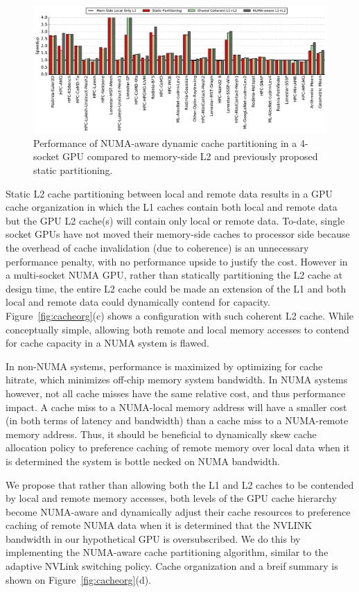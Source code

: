 \begin{figure}[t]
    \centering
    \includegraphics[width=1.0\textwidth]{figures/plot_merged_cache_WB.pdf}
    \caption{Performance of NUMA-aware dynamic cache partitioning in a 4-socket GPU compared to memory-side L2 and previously proposed static partitioning.}
    \label{fig:dynamiccaching}
\end{figure}

Static L2 cache partitioning between local and remote data results in a GPU cache
organization in which the L1 caches contain both local and remote data but the GPU
L2 cache(s) will contain only local or remote data.  To-date, single socket GPUs
have not moved their memory-side caches to processor side because the overhead of
cache invalidation (due to coherence) is an unnecessary performance penalty, with
no performance upside to justify the cost.  However in a multi-socket NUMA GPU,
rather than statically partitioning the L2 cache at design time, the entire L2 cache
could be made an extension of the L1 and both local and remote data could dynamically
contend for capacity. Figure~\ref{fig:cacheorg}(c) shows a configuration with such coherent L2 cache. While conceptually simple, allowing both remote and local
memory accesses to contend for cache capacity in a NUMA system is flawed.

In non-NUMA systems, performance is maximized by optimizing for cache hitrate, which
minimizes off-chip memory system bandwidth.  In NUMA systems however, not all cache
misses have the same relative cost, and thus performance impact.  A cache miss to a 
NUMA-local memory address will have a smaller cost (in both terms of latency and bandwidth)
than a cache miss to a NUMA-remote memory address.  Thus, it should be beneficial
to dynamically skew cache allocation policy to preference caching of remote memory over local
data when it is determined the system is bottle necked on NUMA bandwidth.

We propose that rather than allowing both the L1 and L2 caches to be contended by local
and remote memory accesses,  both levels of the GPU cache hierarchy become NUMA-aware
and dynamically adjust their cache resources to preference caching of remote NUMA
data when it is determined that the NVLINK bandwidth in our hypothetical GPU is
oversubscribed.  We do this by implementing the NUMA-aware cache partitioning
algorithm, similar to the adaptive NVLink switching policy. Cache organization and a breif summary is shown on Figure~\ref{fig:cacheorg}(d).

